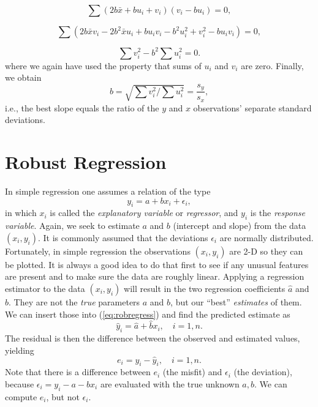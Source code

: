 $$
\sum (2b \bar{x} + bu_i + v_i) (v_i - bu_i) = 0,
$$

$$
\sum (2b \bar{x} v_i - 2b ^2  \bar{x} u_i + b u_i v_i - b^2 u^2_i + v^2_i - b u_i v_i ) = 0,
$$

$$
\sum v^2_i - b^2 \sum u^2_i = 0.
$$
where we again have used the property that sums of $u_i$ and $v_i$ are zero.  Finally, we obtain
\begin{equation}
b = \sqrt{ \sum v^2_i / \sum u^2_i} = \frac{s_y}{s_x},
\end{equation}
i.e., the best slope equals the ratio of the $y$ and $x$ observations' separate standard deviations.

\section{Robust Regression}

	In simple regression one assumes a relation of the type
\begin{equation}
y_i = a + b x_i + \epsilon_i,
\label{eq:robregress}
\end{equation}
in which $x_i$ is called the \emph{explanatory variable} or \emph{regressor}, and $y_i$ is the \emph{response variable}.
Again, we seek to estimate $a$ and $b$ (intercept and slope) from the data 
$(x_i , y_i)$.  It is commonly assumed 
that the deviations $\epsilon_i$ are normally distributed.
Fortunately, in simple regression the observations $(x_i, y_i)$ are 2-D so they can be plotted.  It 
is always a good idea to do that first to see if any unusual features are present and to make sure 
the data are roughly linear.
Applying a regression estimator to the data $(x_i, y_i)$ will result in the two regression 
coefficients $\hat{a}$  and $\hat{b}$.  They are not the \emph{true} parameters $a$ and $b$, but our ``best'' \emph{estimates} of 
them.  We can insert those into (\ref{eq:robregress}) and find the predicted estimate as
\begin{equation}
\hat{y}_i = \hat{a} + \hat{b} x_i,\quad i = 1,n.
\end{equation}	 
The residual is then the difference between the observed and estimated values, yielding
\begin{equation}
e_i = y_i - \hat{y}_i,\quad i = 1,n.
\end{equation} 	
Note that there is a difference between $e_i$ (the misfit) and 
$\epsilon_i$ (the deviation), because $\epsilon_i = y_i - a - b x_i$ are
evaluated with the true unknown $a,b$.  We can compute $e_i$, but not $\epsilon_i$.

